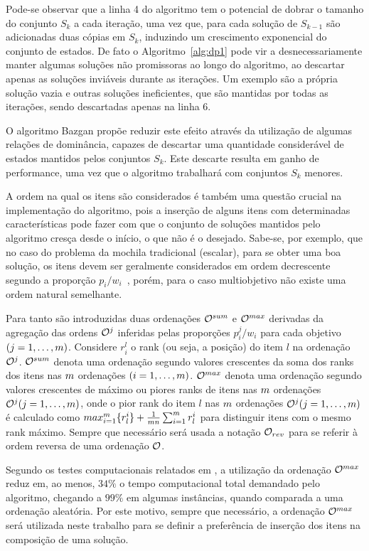 Pode-se observar que a linha 4 do algoritmo tem o potencial de dobrar o tamanho do conjunto $S_k$
a cada iteração, uma vez que, para cada solução de $S_{k-1}$ são adicionadas duas cópias em $S_k$,
induzindo um crescimento exponencial do conjunto de estados.
De fato o Algoritmo~\ref{alg:dp1} pode vir a desnecessariamente manter algumas soluções
não promissoras ao longo do algoritmo, ao descartar apenas as soluções inviáveis durante as iterações.
Um exemplo são a própria solução vazia e outras soluções ineficientes, que são mantidas
por todas as iterações, sendo descartadas apenas na linha 6.

O algoritmo Bazgan propõe reduzir este efeito através da
utilização de algumas relações de dominância, capazes de descartar uma
quantidade considerável de estados mantidos pelos conjuntos $S_k$.
Este descarte resulta em ganho de performance, uma vez que o algoritmo trabalhará com
conjuntos $S_k$ menores.

A ordem na qual os itens são considerados é também uma questão crucial na implementação
do algoritmo, pois a inserção de alguns itens com determinadas características
pode fazer com que o conjunto de soluções mantidos pelo algoritmo cresça desde o início,
o que não é o desejado.
Sabe-se, por exemplo, que no caso do problema da mochila tradicional (escalar),
para se obter uma boa solução, os itens devem ser geralmente considerados em
ordem decrescente segundo a proporção
$p_i/w_i$~\cite{ehrgott2013multicriteria, martello1990knapsack},
porém, para o caso multiobjetivo não existe uma ordem natural semelhante.

Para tanto são introduzidas duas ordenações $\mathcal{O}^{sum}$ e $\mathcal{O}^{max}$
derivadas da agregação das ordens $\mathcal{O}^j$ inferidas pelas proporções
$p_i^j/w_i$ para cada objetivo $(j = 1, \ldots, m)$.
Considere $r_i^l$ o rank (ou seja, a posição) do item $l$ na ordenação $\mathcal{O}^j$.
$\mathcal{O}^{sum}$ denota uma ordenação segundo valores crescentes da soma dos
ranks dos itens nas $m$ ordenações $(i = 1, \ldots, m)$.
$\mathcal{O}^{max}$ denota uma ordenação segundo valores crescentes de máximo ou
piores ranks de itens nas $m$ ordenações $\mathcal{O}^j (j = 1, \ldots, m)$,
onde o pior rank do item $l$ nas $m$ ordenações $\mathcal{O}^j (j = 1, \ldots, m)$
é calculado como $max_{i=1}^{m}\{r_l^i\} + \frac{1}{m n} \sum_{i = 1}^{m} r_l^i$
para distinguir itens com o mesmo rank máximo.
Sempre que necessário será usada a notação $\mathcal{O}_{rev}$ para se referir à ordem
reversa de uma ordenação $\mathcal{O}$.

Segundo os testes computacionais relatados em \cite{bazgan2009},
a utilização da ordenação $\mathcal{O}^{max}$ reduz em, ao menos, $34\%$ o tempo computacional
total demandado pelo algoritmo, chegando a $99\%$ em algumas instâncias, quando
comparada a uma ordenação aleatória.
Por este motivo, sempre que necessário, a ordenação $\mathcal{O}^{max}$ será
utilizada neste trabalho para se definir a preferência de inserção dos itens na
composição de uma solução.

